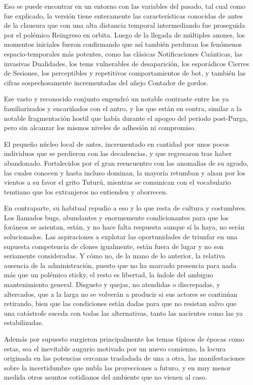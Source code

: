\documentclass[
  spanish,
]{book}
\begin{document}
Eso se puede encontrar en un entorno con las variables del pasado, tal cual como fue explicado, la versión tiene enteramente las características conocidas de antes de la clausura que con una alta distancia temporal intermediando fue proseguida por el polémico Reingreso en orbita. Luego de la llegada de múltiples anones, los momentos iniciales fueron confirmando que así también perduran los fenómenos espacio-temporales más potentes, como las clásicas Notificaciones Cuánticas, las invasivas Dualidades, los tems vulnerables de desaparición, los esporádicos Cierres de Sesiones, los perceptibles y repetitivos comportamientos de bot, y también las cifras sospechosamente incrementadas del añejo Contador de gordos.

Ese vasto y reconocido conjunto engendró un notable contraste entre los ya familiarizados y encariñados con el antro, y los que están en contra, similar a la notable fragmentación hostil que había durante el apogeo del periodo post-Purga, pero sin alcanzar los mismos niveles de adhesión ni compromiso.

El pequeño núcleo local de antes, incrementado en cantidad por unos pocos individuos que se perdieron con las decadencias, y que regresaron tras haber abandonado. Fortalecidos por el gran reencuentro con las anomalías de su agrado, las cuales conocen y hasta incluso dominan, la mayoría retumban y alzan por los vientos a su favor el grito Tuturú, mientras se comunican con el vocabulario temtiano que los extranjeros no entienden y aborrecen.

En contraparte, su habitual repudio a eso y lo que resta de cultura y costumbres. Los llamados bugs, abundantes y enormemente condicionantes para que los foráneos se asientan, están, y no hace falta respuesta aunque sí la haya, no serán solucionados. Las aspiraciones a explotar las oportunidades de triunfar en una supuesta competencia de clones igualmente, están fuera de lugar y no son seriamente consideradas. Y cómo no, de la mano de lo anterior, la relativa ausencia de la administración, puesto que no ha marcado presencia para nada más que un polémico sticky, el resto es libertad, la índole del ambiguo mantenimiento general. Disgusto y quejas, no atendidas o discrepadas, y altercados, que a la larga no se volverán a producir si sus actores se continúan retirando, bien que las condiciones están dadas para que no resistan salvo que una catástrofe suceda con todas las alternativas, tanto las nacientes como las ya estabilizadas.

Además por supuesto surgieron principalmente los temas típicos de épocas como estas, sea el inevitable augurio motivado por un nuevo comienzo, la locura originada en las potencias cercanas trasladada de una a otra, las manifestaciones sobre la incertidumbre que nubla las proyecciones a futuro, y en muy menor medida otros asuntos cotidianos del ambiente que no vienen al caso.
\end{document}
